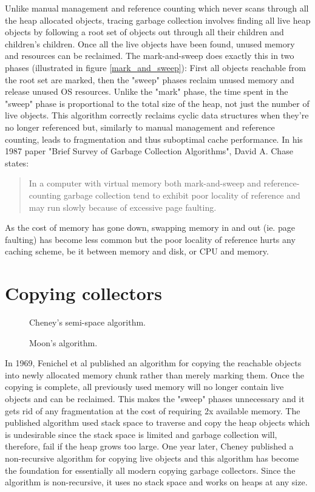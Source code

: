 \documentclass[a4paper,oneside]{memoir}
\begin{document}
Unlike manual management and reference counting which never scans through all
the heap allocated objects, tracing garbage collection involves finding all live
heap objects by following a root set of objects out through all their children
and children's children.\cite{Appel:1987} Once all the live objects have been found, unused memory
and resources can be reclaimed.
The mark-and-sweep does exactly this in two phases (illustrated in figure \ref{mark_and_sweep}):
First all objects reachable from the root set are marked, then the "sweep" phases reclaim unused memory and
release unused OS resources. Unlike the "mark" phase, the time spent in the
"sweep" phase is proportional to the total size of the heap, not just the number
of live objects.\cite{Wilson:1992}
This algorithm correctly reclaims cyclic data structures when they're no longer
referenced but, similarly to manual management and reference counting, leads to
fragmentation and thus suboptimal cache performance.
In his 1987 paper "Brief Survey of Garbage Collection Algorithms", David A. Chase states:
\blockquote{In a computer with virtual memory both mark-and-sweep and
reference-counting garbage collection tend to exhibit poor locality of reference
and may run slowly because of excessive page faulting.}
\cite{Chase:1987} As the cost of memory has gone down, swapping memory in and
out (ie. page faulting) has become less common but the poor locality of reference
hurts any caching scheme, be it between memory and disk, or CPU and memory.\cite{Grunwald:1993}


\section{Copying collectors}
\begin{figure}
  \centering
  
  \caption{Cheney's semi-space algorithm.}
  \label{cheney_algorithm}
\end{figure}
\begin{figure}[b]
  \centering
  
  \caption{Moon's algorithm.}
  \label{moon_algorithm}
\end{figure}

In 1969, Fenichel et al published an algorithm for copying the reachable objects
into newly allocated memory chunk rather than merely marking them.\cite{Fenichel} Once the copying
is complete, all previously used memory will no longer contain live objects
and can be reclaimed. This makes the "sweep" phases unnecessary and it gets rid
of any fragmentation at the cost of requiring 2x available memory. The published
algorithm used stack space to traverse and copy the heap objects which is
undesirable since the stack space is limited and garbage collection will, therefore,
fail if the heap grows too large. One year later, Cheney published a non-recursive
algorithm for copying live objects and this algorithm has become the foundation
for essentially all modern copying garbage collectors.\cite{Cheney:1970} Since the algorithm is
non-recursive, it uses no stack space and works on heaps at any size.
\end{document}
